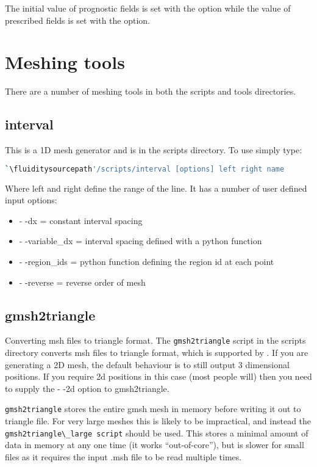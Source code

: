The initial value of prognostic fields is set with the
 option while the value of
prescribed fields is set with the  option.

\section{Meshing tools}

There are a number of meshing tools in both the scripts and tools directories.

\subsection{interval}
This is a 1D mesh generator and is in the scripts directory. To use simply type:


\begin{lstlisting}[language = Bash]
`\fluiditysourcepath'/scripts/interval [options] left right name 
\end{lstlisting}

Where left and right define the range of the line. It has a number of user defined input options:

\begin{itemize}
\item - -dx = constant interval spacing
\item - -variable\_dx = interval spacing defined with a python function
\item - -region\_ids = python function defining the region id at each point
\item - -reverse = reverse order of mesh
\end{itemize}

\subsection{gmsh2triangle}
Converting msh files to triangle format. The \lstinline[language=Bash]{gmsh2triangle} script in the scripts
directory converts msh files to triangle format, which is supported by \fluidity.
If you are generating a 2D mesh, the default behaviour is to still
output 3 dimensional positions. If you require 2d positions in this case (most
people will) then you need to supply the - -2d option to gmsh2triangle.

\lstinline[language=Bash]{gmsh2triangle} stores the entire gmsh mesh in memory before writing it out to
triangle file. For very large meshes this is likely to be impractical,
and instead the \lstinline[language=Bash]{gmsh2triangle\_large script}
should be used. This stores a minimal
amount of data in memory at any one time (it works ``out-of-core''), but
is slower for small files as it requires the input .msh file to be read multiple
times.


